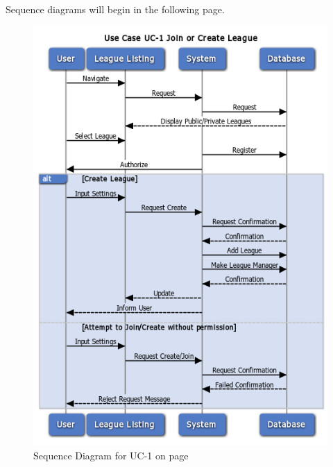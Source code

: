 Sequence diagrams will begin in the following page.

\begin{figure}
\centering
\includegraphics[width=5.5in]{./Diagrams/SystemSequenceDiagrams/uc1.png}
\caption{Sequence Diagram for UC-1 on page \pageref{UC-1}}
\end{figure}

